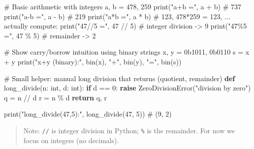 \documentclass[
  letterpaper,
  DIV=11,
  numbers=noendperiod]{scrreprt}
\newenvironment{Shaded}{\begin{snugshade}}{\end{snugshade}}
\newcommand{\BaseNTok}[1]{\textcolor[rgb]{0.68,0.00,0.00}{#1}}
\newcommand{\BuiltInTok}[1]{\textcolor[rgb]{0.00,0.23,0.31}{#1}}
\newcommand{\CommentTok}[1]{\textcolor[rgb]{0.37,0.37,0.37}{#1}}
\newcommand{\ControlFlowTok}[1]{\textcolor[rgb]{0.00,0.23,0.31}{\textbf{#1}}}
\newcommand{\DecValTok}[1]{\textcolor[rgb]{0.68,0.00,0.00}{#1}}
\newcommand{\KeywordTok}[1]{\textcolor[rgb]{0.00,0.23,0.31}{\textbf{#1}}}
\newcommand{\NormalTok}[1]{\textcolor[rgb]{0.00,0.23,0.31}{#1}}
\newcommand{\OperatorTok}[1]{\textcolor[rgb]{0.37,0.37,0.37}{#1}}
\newcommand{\PreprocessorTok}[1]{\textcolor[rgb]{0.68,0.00,0.00}{#1}}
\newcommand{\StringTok}[1]{\textcolor[rgb]{0.13,0.47,0.30}{#1}}
\begin{document}
\begin{Shaded}
\begin{Highlighting}[]
\CommentTok{\# Basic arithmetic with integers}
\NormalTok{a, b }\OperatorTok{=} \DecValTok{478}\NormalTok{, }\DecValTok{259}
\BuiltInTok{print}\NormalTok{(}\StringTok{"a+b ="}\NormalTok{, a }\OperatorTok{+}\NormalTok{ b)      }\CommentTok{\# 737}
\BuiltInTok{print}\NormalTok{(}\StringTok{"a{-}b ="}\NormalTok{, a }\OperatorTok{{-}}\NormalTok{ b)      }\CommentTok{\# 219}
\BuiltInTok{print}\NormalTok{(}\StringTok{"a*b ="}\NormalTok{, a }\OperatorTok{*}\NormalTok{ b)      }\CommentTok{\# 123,  478*259 = 123,  ... actually compute:}
\BuiltInTok{print}\NormalTok{(}\StringTok{"47//5 ="}\NormalTok{, }\DecValTok{47} \OperatorTok{//} \DecValTok{5}\NormalTok{)  }\CommentTok{\# integer division {-}\textgreater{} 9}
\BuiltInTok{print}\NormalTok{(}\StringTok{"47\%5  ="}\NormalTok{, }\DecValTok{47} \OperatorTok{\%} \DecValTok{5}\NormalTok{)   }\CommentTok{\# remainder {-}\textgreater{} 2}

\CommentTok{\# Show carry/borrow intuition using binary strings}
\NormalTok{x, y }\OperatorTok{=} \BaseNTok{0b1011}\NormalTok{, }\BaseNTok{0b0110}
\NormalTok{s }\OperatorTok{=}\NormalTok{ x }\OperatorTok{+}\NormalTok{ y}
\BuiltInTok{print}\NormalTok{(}\StringTok{"x+y (binary):"}\NormalTok{, }\BuiltInTok{bin}\NormalTok{(x), }\StringTok{"+"}\NormalTok{, }\BuiltInTok{bin}\NormalTok{(y), }\StringTok{"="}\NormalTok{, }\BuiltInTok{bin}\NormalTok{(s))}

\CommentTok{\# Small helper: manual long division that returns (quotient, remainder)}
\KeywordTok{def}\NormalTok{ long\_divide(n: }\BuiltInTok{int}\NormalTok{, d: }\BuiltInTok{int}\NormalTok{):}
    \ControlFlowTok{if}\NormalTok{ d }\OperatorTok{==} \DecValTok{0}\NormalTok{:}
        \ControlFlowTok{raise} \PreprocessorTok{ZeroDivisionError}\NormalTok{(}\StringTok{"division by zero"}\NormalTok{)}
\NormalTok{    q }\OperatorTok{=}\NormalTok{ n }\OperatorTok{//}\NormalTok{ d}
\NormalTok{    r }\OperatorTok{=}\NormalTok{ n }\OperatorTok{\%}\NormalTok{ d}
    \ControlFlowTok{return}\NormalTok{ q, r}

\BuiltInTok{print}\NormalTok{(}\StringTok{"long\_divide(47,5):"}\NormalTok{, long\_divide(}\DecValTok{47}\NormalTok{, }\DecValTok{5}\NormalTok{))  }\CommentTok{\# (9, 2)}
\end{Highlighting}
\end{Shaded}

\begin{quote}
Note: \texttt{//} is integer division in Python; \texttt{\%} is the
remainder. For now we focus on integers (no decimals).
\end{quote}
\end{document}
